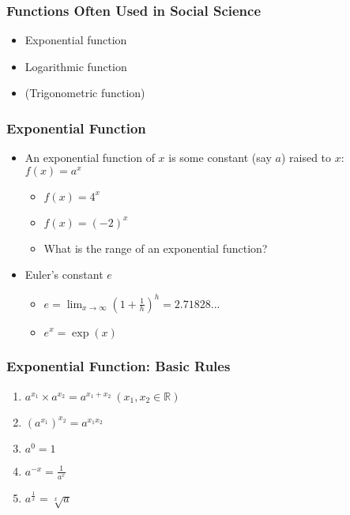 \documentclass[pdflatex, 12pt]{beamer}
\newcommand{\R}{\mathbb{R}}
\begin{document}
\begin{frame}
\frametitle{Functions Often Used in Social Science}
\begin{itemize}
\item Exponential function
\vspace{0.4cm}
\item Logarithmic function
\vspace{0.4cm}
\item (Trigonometric function)
\end{itemize}
\end{frame}

\begin{frame}
\frametitle{Exponential Function}
\begin{itemize}
\item An exponential function of $x$ is some constant (say $a$) raised to $x$: $f(x) = a^x$
 \begin{itemize}
 \item $f(x) = 4^x$
 \item $f(x) = (-2)^x$
 \item What is the range of an exponential function?
 \end{itemize}
\vspace{0.4cm}
\item Euler's constant $e$
 \begin{itemize}
 \item $e = \lim_{x \to \infty}(1 + \frac{1}{h})^h = 2.71828...$
 \item $e^x = \exp(x)$
 \end{itemize}
\end{itemize}
\end{frame}

\begin{frame}
\frametitle{Exponential Function: Basic Rules}
\begin{enumerate}
\item $a^{x_1} \times a^{x_2} = a^{x_1 + x_2} \ (x_1, x_2 \in \R)$
\item $(a^{x_1})^{x_2} = a^{x_1 x_2}$
\item $a^0 = 1$
\item $a^{-x} = \frac{1}{a^{x}}$
\item $a^{\frac{1}{x}} = \sqrt[x]{a}$
\end{enumerate}
\end{frame}
\end{document}
